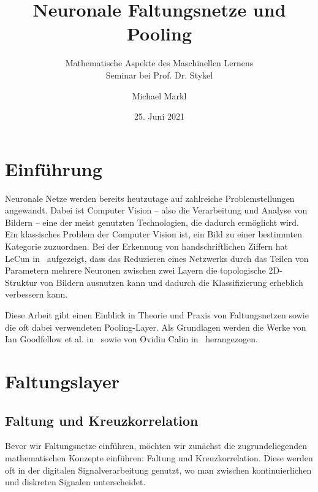 \documentclass[paper=a4, 	%
		fontsize=11pt, 		%
		abstracton, 	%
		headsepline, 	%
		notitlepage	%
		]{scrartcl}
\title{Neuronale Faltungsnetze und Pooling}
\author{Michael Markl}
\date{25. Juni 2021}
\subtitle{Mathematische Aspekte des Maschinellen Lernens\\ Seminar bei Prof. Dr. Stykel}
\theoremstyle{definition}
\begin{document}
\maketitle


\section{Einführung}

Neuronale Netze werden bereits heutzutage auf zahlreiche Problemstellungen angewandt.
Dabei ist Computer Vision -- also die Verarbeitung und Analyse von Bildern -- eine der meist genutzten Technologien, die dadurch ermöglicht wird.
Ein klassisches Problem der Computer Vision ist, ein Bild zu einer bestimmten Kategorie zuzuordnen.
Bei der Erkennung von handschriftlichen Ziffern hat LeCun in~\cite{LeCun1989} aufgezeigt, dass das Reduzieren eines Netzwerks durch das Teilen von Parametern mehrere Neuronen zwischen zwei Layern die topologische 2D-Struktur von Bildern ausnutzen kann und dadurch die Klassifizierung erheblich verbessern kann.

Diese Arbeit gibt einen Einblick in Theorie und Praxis von Faltungsnetzen sowie die oft dabei verwendeten Pooling-Layer.
Als Grundlagen werden die Werke von Ian Goodfellow et al. in~\cite[Kapitel~9]{Goodfellow-et-al-2016} sowie von Ovidiu Calin in~\cite[Kapitel~15,16]{Calin2020} herangezogen.

\section{Faltungslayer}

\subsection{Faltung und Kreuzkorrelation}\label{subsec:convolution}

Bevor wir Faltungsnetze einführen, möchten wir zunächst die zugrundeliegenden mathematischen Konzepte einführen:
Faltung und Kreuzkorrelation.
Diese werden oft in der digitalen Signalverarbeitung genutzt, wo man zwischen kontinuierlichen und diskreten Signalen unterscheidet.

\newcommand{\llambda}{\lambda}
\newcommand{\cmeasure}{\mu_c}
\end{document}
